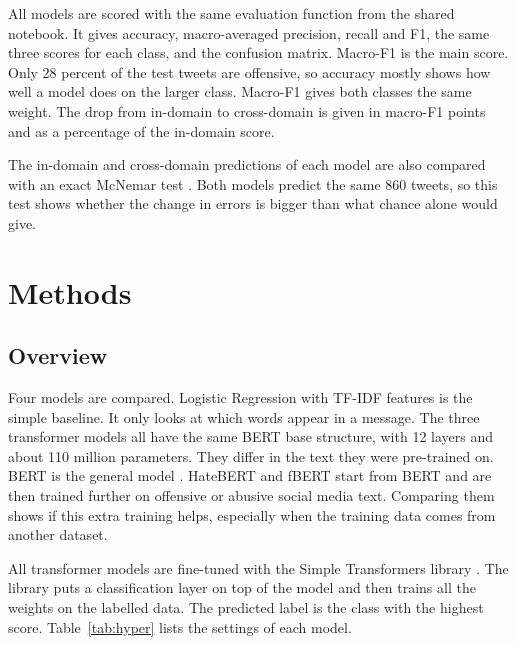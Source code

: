 \documentclass[11pt,a4paper]{article}
\begin{document}
All models are scored with the same evaluation function from the shared notebook. It gives accuracy, macro-averaged precision, recall and F1, the same three scores for each class, and the confusion matrix. Macro-F1 is the main score. Only 28 percent of the test tweets are offensive, so accuracy mostly shows how well a model does on the larger class. Macro-F1 gives both classes the same weight. The drop from in-domain to cross-domain is given in macro-F1 points and as a percentage of the in-domain score.

The in-domain and cross-domain predictions of each model are also compared with an exact McNemar test \citep{mcnemar1947note}. Both models predict the same 860 tweets, so this test shows whether the change in errors is bigger than what chance alone would give.

\section{Methods}

\subsection{Overview}

Four models are compared. Logistic Regression with TF-IDF features is the simple baseline. It only looks at which words appear in a message. The three transformer models all have the same BERT base structure, with 12 layers and about 110 million parameters. They differ in the text they were pre-trained on. BERT is the general model \citep{devlin2019bert}. HateBERT and fBERT start from BERT and are then trained further on offensive or abusive social media text. Comparing them shows if this extra training helps, especially when the training data comes from another dataset.

All transformer models are fine-tuned with the Simple Transformers library \citep{rajapakse2019simpletransformers}. The library puts a classification layer on top of the model and then trains all the weights on the labelled data. The predicted label is the class with the highest score. Table~\ref{tab:hyper} lists the settings of each model.
\end{document}
